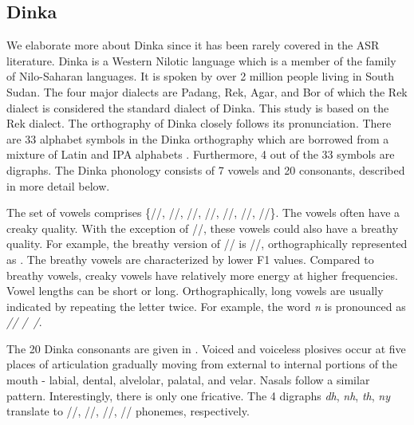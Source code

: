 \documentclass[a4paper]{article}
\begin{document}
\subsection{Dinka} \vspace{-1mm}
We elaborate more about Dinka since it has been rarely covered in the ASR literature. Dinka is a Western Nilotic language which is a member of the family of Nilo-Saharan languages. It is spoken by over 2 million people living in South Sudan. The four major dialects are Padang, Rek, Agar, and Bor of which the Rek dialect is considered the standard dialect of Dinka. This study is based on the Rek dialect. The orthography of Dinka closely follows its pronunciation. There are 33 alphabet symbols in the Dinka orthography which are borrowed from a mixture of Latin and IPA alphabets \cite{DinkaOmniglot}. Furthermore, 4 out of the 33 symbols are digraphs. The Dinka phonology \cite{Remijsen-LuanyjangDinka} consists of 7 vowels and 20 consonants, described in more detail below.

The set of vowels comprises \{//, //, //, //, //, //, //\}. %
The vowels often have a creaky quality. With the exception of //, these vowels could also have a breathy quality. For example, the breathy version of // is //, orthographically represented as . The breathy vowels are characterized by lower F1 values. Compared to breathy vowels, creaky vowels have relatively more energy at higher frequencies. Vowel lengths can be short or long. Orthographically, long vowels are usually indicated by repeating the letter twice. For example, the word \emph{n} is pronounced as \emph{// /~/}.

The 20 Dinka consonants are given in \cite{DinkaWiki}. Voiced and voiceless plosives occur at five places of articulation gradually moving from external to internal portions of the mouth - labial, dental, alvelolar, palatal, and velar. Nasals follow a similar pattern. Interestingly, there is only one fricative. The 4 digraphs \emph{dh}, \emph{nh}, \emph{th}, \emph{ny} translate to /\textipa{\|[d}/, /\textipa{\|[n}/, /\textipa{\|[t}/, /\textltailn/ phonemes, respectively.
\end{document}
